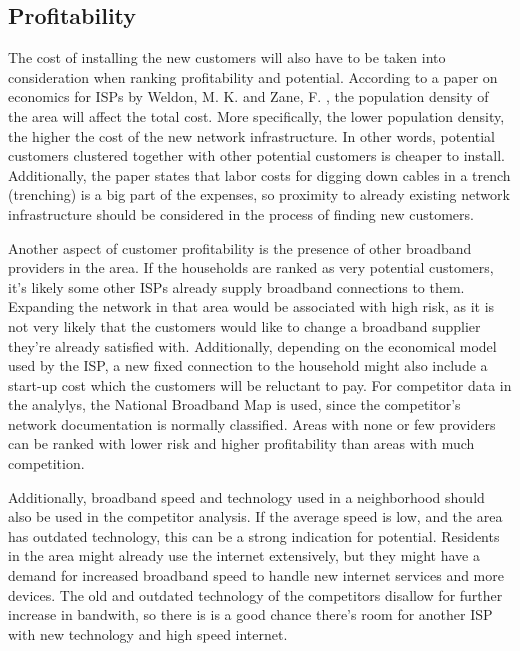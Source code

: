 \documentclass[twocolumn]{article}
\begin{document}
\subsection{Profitability}
\label{sub:Profitability}
The cost of installing the new customers will also have to be taken into consideration when ranking profitability and potential. According to a paper on economics for ISPs by Weldon, M. K. and Zane, F. \cite{Weldon2003-xq}, the population density of the area will affect the total cost. More specifically, the lower population density, the higher the cost of the new network infrastructure. In other words, potential customers clustered together with other potential customers is cheaper to install. Additionally, the paper states that labor costs for digging down cables in a trench (trenching) is a big part of the expenses, so proximity to already existing network infrastructure should be considered in the process of finding new customers. 

Another aspect of customer profitability is the presence of other broadband providers in the area. If the households are ranked as very potential customers, it's likely some other ISPs already supply broadband connections to them. Expanding the network in that area would be associated with high risk, as it is not very likely that the customers would like to change a broadband supplier they're already satisfied with. Additionally, depending on the economical model used by the ISP, a new fixed connection to the household might also include a start-up cost which the customers will be reluctant to pay. For competitor data in the analylys, the National Broadband Map is used, since the competitor's network documentation is normally classified. Areas with none or few providers can be ranked with lower risk and higher profitability than areas with much competition.

Additionally, broadband speed and technology used in a neighborhood should also be used in the competitor analysis. If the average speed is low, and the area has outdated technology, this can be a strong indication for potential. Residents in the area might already use the internet extensively, but they might have a demand for increased broadband speed to handle new internet services and more devices. The old and outdated technology of the competitors disallow for further increase in bandwith, so there is is a good chance there's room for another ISP with new technology and high speed internet.
\end{document}
